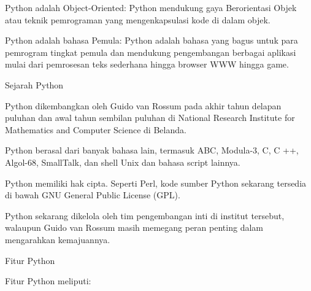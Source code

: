 \vspace{14pt}
\noindent 
{\fontsize{14pt}{14pt}\selectfont Python adalah Object-Oriented: Python mendukung gaya Berorientasi Objek atau teknik pemrograman yang mengenkapsulasi kode di dalam objek. \\} \par
\vspace{14pt}
\noindent 
{\fontsize{14pt}{14pt}\selectfont Python adalah bahasa Pemula: Python adalah bahasa yang bagus untuk para pemrogram tingkat pemula dan mendukung pengembangan berbagai aplikasi mulai dari pemrosesan teks sederhana hingga browser WWW hingga game. \\} \par
\vspace{14pt}
\noindent 
{\fontsize{14pt}{14pt}\selectfont Sejarah Python \\} \par
\noindent 
{\fontsize{14pt}{14pt}\selectfont Python dikembangkan oleh Guido van Rossum pada akhir tahun delapan puluhan dan awal tahun sembilan puluhan di National Research Institute for Mathematics and Computer Science di Belanda. \\} \par
\vspace{14pt}
\noindent 
{\fontsize{14pt}{14pt}\selectfont Python berasal dari banyak bahasa lain, termasuk ABC, Modula-3, C, C ++, Algol-68, SmallTalk, dan shell Unix dan bahasa script lainnya. \\} \par
\vspace{14pt}
\noindent 
{\fontsize{14pt}{14pt}\selectfont Python memiliki hak cipta. Seperti Perl, kode sumber Python sekarang tersedia di bawah GNU General Public License (GPL). \\} \par
\vspace{14pt}
\noindent 
{\fontsize{14pt}{14pt}\selectfont Python sekarang dikelola oleh tim pengembangan inti di institut tersebut, walaupun Guido van Rossum masih memegang peran penting dalam mengarahkan kemajuannya. \\} \par
\vspace{14pt}
\noindent 
{\fontsize{14pt}{14pt}\selectfont Fitur Python \\} \par
\noindent 
{\fontsize{14pt}{14pt}\selectfont Fitur Python meliputi: \\} \par
\vspace{14pt}
